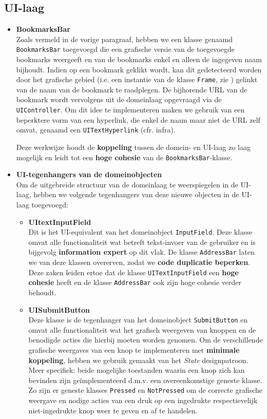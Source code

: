 \documentclass[12pt]{article}
\begin{document}
\subsection{UI-laag}
\begin{itemize}
	\item \textbf{BookmarksBar}\\
	Zoals vermeld in de vorige paragraaf, hebben we een klasse genaamd \texttt{BookmarksBar} toegevoegd die een grafische versie van de toegevoegde bookmarks weergeeft en van de bookmarks enkel en alleen de ingegeven naam bijhoudt. Indien op een bookmark geklikt wordt, kan dit gedetecteerd worden door het grafische gebied (i.e. een instantie van de klasse \texttt{Frame}, zie ) gelinkt van de naam van de bookmark te raadplegen. De bijhorende URL van de bookmark wordt vervolgens uit de domeinlaag opgevraagd via de \texttt{UIController}. Om dit idee te implementeren maken we gebruik van een beperktere vorm van een hyperlink, die enkel de naam maar niet de URL zelf omvat, genaamd een \texttt{UITextHyperlink} (cfr. infra).
	
	Deze werkwijze houdt de \textbf{koppeling} tussen de domein- en UI-laag zo laag mogelijk en leidt tot een \textbf{hoge cohesie} van de \texttt{BookmarksBar}-klasse.
	\item  \textbf{UI-tegenhangers van de domeinobjecten}\\
	Om de uitgebreide structuur van de domeinlaag te weerspiegelen in de UI-laag, hebben we volgende tegenhangers van deze nieuwe objecten in de UI-laag toegevoegd:
	\begin{itemize}
		\item \textbf{UItextInputField}\\
		Dit is het UI-equivalent van het domeinobject \texttt{InputField}. Deze klasse omvat alle functionaliteit wat betreft tekst-invoer van de gebruiker en is bijgevolg \textbf{information expert} op dit vlak. De klasse \texttt{AddressBar} laten we van deze klassen overerven, zodat we \textbf{code duplicatie beperken}. Deze zaken leiden ertoe dat de klasse \texttt{UITextInputField} een \textbf{hoge cohesie} heeft en de klasse \texttt{AddressBar} ook zijn hoge cohesie verder behoudt.
		
		\item \textbf{UISubmitButton}\\
		Deze klasse is de tegenhanger van het domeinobject \texttt{SubmitButton} en omvat alle functionaliteit wat het grafisch weergeven van knoppen en de benodigde acties die hierbij moeten worden genomen. Om de verschillende grafische weergaves van een knop te implementeren met \textbf{minimale koppeling}, hebben we gebruik gemaakt van het \textit{State} designpatroon. Meer specifiek: beide mogelijke toestanden waarin een knop zich kan bevinden zijn geïmplementeerd d.m.v. een overeenkomstige geneste klasse. Zo zijn er geneste klasses \texttt{Pressed} en \texttt{NotPressed} om de correcte grafische weergave en nodige acties van een druk op een ingedrukte respectievelijk niet-ingedrukte knop weer te geven en af te handelen.
		

\end{itemize}
\end{itemize}
\end{document}
